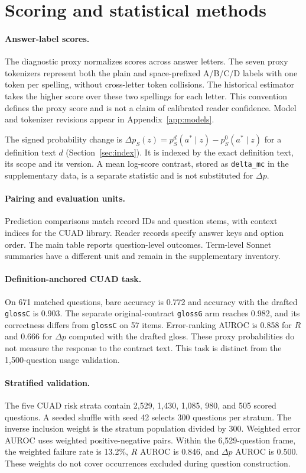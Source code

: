 \section{Scoring and statistical methods}
\label{app:statistics}
\paragraph{Answer-label scores.}
The diagnostic proxy normalizes scores across answer letters. The seven proxy tokenizers represent both the plain and space-prefixed A/B/C/D labels with one token per spelling, without cross-letter token collisions. The historical estimator takes the higher score over these two spellings for each letter. This convention defines the proxy score and is not a claim of calibrated reader confidence. Model and tokenizer revisions appear in Appendix~\ref{app:models}.

The signed probability change is $\Delta p_S(z)=p_S^d(a^*\mid z)-p_S^0(a^*\mid z)$ for a definition text $d$ (Section~\ref{sec:index}). It is indexed by the exact definition text, its scope and its version. A mean log-score contrast, stored as \texttt{delta\_mc} in the supplementary data, is a separate statistic and is not substituted for $\Delta p$.

\paragraph{Pairing and evaluation units.}
Prediction comparisons match record IDs and question stems, with context indices for the CUAD library. Reader records specify answer keys and option order. The main table reports question-level outcomes. Term-level Sonnet summaries have a different unit and remain in the supplementary inventory.

\paragraph{Definition-anchored CUAD task.}
On 671 matched questions, bare accuracy is 0.772 and accuracy with the drafted \texttt{glossC} is 0.903. The separate original-contract \texttt{glossG} arm reaches 0.982, and its correctness differs from \texttt{glossC} on 57 items. Error-ranking AUROC is 0.858 for $R$ and 0.666 for $\Delta p$ computed with the drafted gloss. These proxy probabilities do not measure the response to the contract text. This task is distinct from the 1,500-question usage validation.

\paragraph{Stratified validation.}
The five CUAD risk strata contain 2,529, 1,430, 1,085, 980, and 505 scored questions. A seeded shuffle with seed 42 selects 300 questions per stratum. The inverse inclusion weight is the stratum population divided by 300. Weighted error AUROC uses weighted positive-negative pairs. Within the 6,529-question frame, the weighted failure rate is 13.2\%, $R$ AUROC is 0.846, and $\Delta p$ AUROC is 0.500. These weights do not cover occurrences excluded during question construction.

